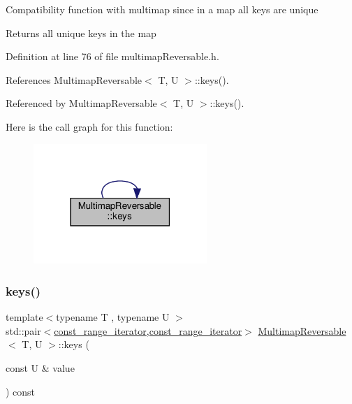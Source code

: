 Compatibility function with multimap since in a map all keys are unique \begin{DoxyReturn}{Returns}
all unique keys in the map 
\end{DoxyReturn}


Definition at line 76 of file multimap\+Reversable.\+h.



References Multimap\+Reversable$<$ T, U $>$\+::keys().



Referenced by Multimap\+Reversable$<$ T, U $>$\+::keys().

Here is the call graph for this function\+:
\nopagebreak
\begin{figure}[H]
\begin{center}
\leavevmode
\includegraphics[width=186pt]{classMultimapReversable_a135171aef1cc98eb99df8eb63843e4da_cgraph}
\end{center}
\end{figure}
\mbox{\label{classMultimapReversable_a3bbe5ef69fa9537be66d4cc020a6306e}} 
\subsubsection{\texorpdfstring{keys()}{keys()}\hspace{0.1cm}{\footnotesize\ttfamily [2/2]}}
{\footnotesize\ttfamily template$<$typename T , typename U $>$ \\
std\+::pair$<$\hyperlink{classMultimapReversable_ae87bcf568586e240e0d294050fa248cb}{const\+\_\+range\+\_\+iterator},\hyperlink{classMultimapReversable_ae87bcf568586e240e0d294050fa248cb}{const\+\_\+range\+\_\+iterator}$>$ \hyperlink{classMultimapReversable}{Multimap\+Reversable}$<$ T, U $>$\+::keys (\begin{DoxyParamCaption}\item[{const U \&}]{value }\end{DoxyParamCaption}) const\hspace{0.3cm}{\ttfamily [inline]}}

